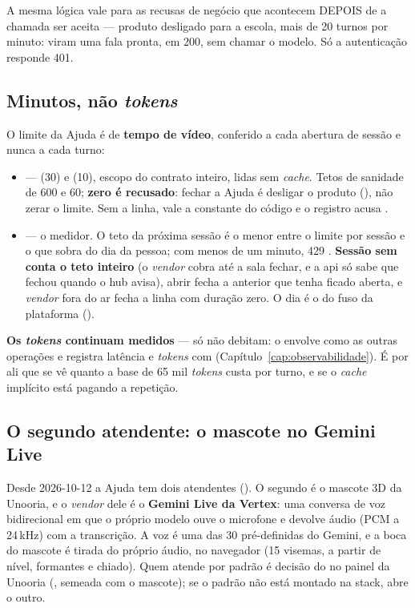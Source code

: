 A mesma lógica vale para as recusas de negócio que acontecem DEPOIS de a
chamada ser aceita --- produto desligado para a escola, mais de 20 turnos por
minuto: viram uma fala pronta, em 200, sem chamar o modelo. Só a autenticação
responde 401.

\subsection{Minutos, não \emph{tokens}}

O limite da Ajuda é de \textbf{tempo de vídeo}, conferido a cada abertura de
sessão e nunca a cada turno:

\begin{itemize}
  \item {} ---  (30) e
     (10), escopo do contrato inteiro, lidas sem
    \emph{cache}. Tetos de sanidade de 600 e 60; \textbf{zero é recusado}:
    fechar a Ajuda é desligar o produto  (), não zerar o
    limite. Sem a linha, vale a constante do código e o registro acusa
    .
  \item {} --- o medidor. O teto da próxima sessão é o menor
    entre o limite por sessão e o que sobra do dia da pessoa; com menos de um
    minuto, 429 . \textbf{Sessão sem  conta o teto
    inteiro} (o \emph{vendor} cobra até a sala fechar, e a api só sabe que
    fechou quando o hub avisa), abrir fecha a anterior que tenha ficado aberta,
    e \emph{vendor} fora do ar fecha a linha com duração zero. O dia é o do fuso
    da plataforma ().
\end{itemize}

\textbf{Os \emph{tokens} continuam medidos} --- só não debitam: o
 envolve  como as outras operações e
registra latência e \emph{tokens} com 
(Capítulo~\ref{cap:observabilidade}). É por ali que se vê quanto a base de 65 mil
\emph{tokens} custa por turno, e se o \emph{cache} implícito está pagando a
repetição.

\subsection{O segundo atendente: o mascote no Gemini Live}
\label{sec:ia-ajuda-mascote}

Desde 2026-10-12 a Ajuda tem dois atendentes (). O segundo é o
mascote 3D da Unooria, e o \emph{vendor} dele é o \textbf{Gemini Live da
Vertex}: uma conversa de voz bidirecional em que o próprio modelo ouve o
microfone e devolve áudio (PCM a 24\,kHz) com a transcrição. A voz é uma das 30
pré-definidas do Gemini, e a boca do mascote é tirada do próprio áudio, no
navegador (15 visemas, a partir de nível, formantes e chiado). Quem atende por
padrão é decisão do  no painel da Unooria (,
semeada com o mascote); se o padrão não está montado na stack, abre o outro.

